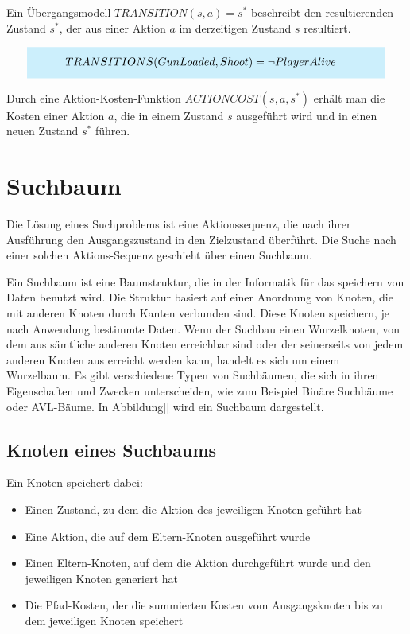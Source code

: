 Ein Übergangsmodell $TRANSITION(s,a) = s^*$ beschreibt den resultierenden Zustand $s^*$, der aus einer Aktion $a$ im derzeitigen Zustand $s$ resultiert.

\[
\highlightbox{0.9\textwidth}{$
    \begin{aligned}
			TRANSITIONS(GunLoaded, Shoot) &= \lnot PlayerAlive
    \end{aligned}
$}
\]

Durch eine Aktion-Kosten-Funktion $ACTIONCOST(s,a,s^*)$ erhält man die Kosten einer Aktion $a$, die in einem Zustand $s$ ausgeführt wird und in einen neuen Zustand $s^*$ führen.

\section{Suchbaum}
\label{chap:suchbaum}

Die Lösung eines Suchproblems ist eine Aktionssequenz, die nach ihrer Ausführung den Ausgangszustand in den Zielzustand überführt. Die Suche nach einer solchen Aktions-Sequenz geschieht über einen Suchbaum.

Ein Suchbaum ist eine Baumstruktur, die in der Informatik für das speichern von Daten benutzt wird. Die Struktur basiert auf einer Anordnung von Knoten, die mit anderen Knoten durch Kanten verbunden sind. Diese Knoten speichern, je nach Anwendung bestimmte Daten. Wenn der Suchbau einen Wurzelknoten, von dem aus sämtliche anderen Knoten erreichbar sind oder der seinerseits von jedem anderen Knoten aus erreicht werden kann, handelt es sich um einem Wurzelbaum. Es gibt verschiedene Typen von Suchbäumen, die sich in ihren Eigenschaften und Zwecken unterscheiden, wie zum Beispiel Binäre Suchbäume oder AVL-Bäume. In Abbildung\ref{} wird ein Suchbaum dargestellt.

\subsection{Knoten eines Suchbaums}
\label{chap: knoten eines suchbaums}

Ein Knoten speichert dabei:
\begin{itemize}
	\item Einen Zustand, zu dem die Aktion des jeweiligen Knoten geführt hat
	\item Eine Aktion, die auf dem Eltern-Knoten ausgeführt wurde
	\item Einen Eltern-Knoten, auf dem die Aktion durchgeführt wurde und den jeweiligen Knoten generiert hat
	\item Die Pfad-Kosten, der die summierten Kosten vom Ausgangsknoten bis zu dem jeweiligen Knoten speichert
\end{itemize}

